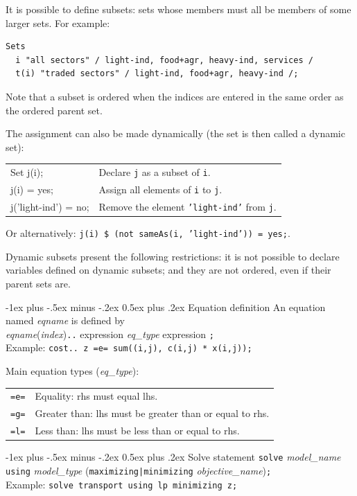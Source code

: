 \documentclass[10pt,landscape,a4paper]{article}
\makeatletter
\renewcommand{\section}{\@startsection{section}{1}{0mm}%
                                {-1ex plus -.5ex minus -.2ex}%
                                {0.5ex plus .2ex}%
                                {\color{blue}\normalfont\large\bfseries}}
\makeatother
\begin{document}
\begin{multicols}{2}
It is possible to define subsets: sets whose members must all be members of some
larger sets. For example:\\
\begin{verbatim}
Sets
  i "all sectors" / light-ind, food+agr, heavy-ind, services /
  t(i) "traded sectors" / light-ind, food+agr, heavy-ind /;
\end{verbatim}
Note that a subset is ordered when the indices are entered in the same order as
the ordered parent set.

The assignment can also be made dynamically (the set is then called a dynamic
set):
\begin{tabularx}{\columnwidth}{@{}>{\ttfamily}l>{\raggedright\arraybackslash}X@{}}
Set j(i);& Declare \texttt{j} as a subset of \texttt{i}. \\
j(i) = yes;& Assign all elements of \texttt{i} to \texttt{j}.\\
j('light-ind') = no;& Remove the element \texttt{'light-ind'} from \texttt{j}.
\end{tabularx}
Or alternatively: \texttt{j(i) \$ (not sameAs(i, 'light-ind')) = yes;}.

Dynamic subsets present the following restrictions: it is not possible to
declare variables defined on dynamic subsets; and they are not ordered, even if
their parent sets are.

\section{Equation definition}
An equation named \emph{eqname} is defined by\\
\emph{eqname}(\emph{index})\verb!..! expression \emph{eq\_type} expression \verb!;!\\
Example: \verb!cost.. z =e= sum((i,j), c(i,j) * x(i,j));!

Main equation types (\emph{eq\_type}):\\
\begin{tabular}{@{}ll@{}}
  \verb!=e=! & Equality: rhs must equal lhs.\\
  \verb!=g=! & Greater than: lhs must be greater than or equal to rhs.\\
  \verb!=l=! & Less than: lhs must be less than or equal to rhs.
\end{tabular}

\columnbreak{}
\section{Solve statement}
\verb!solve! \emph{model\_name} \verb!using! \emph{model\_type} (\verb!maximizing|minimizing! \emph{objective\_name})\verb!;!\\
Example: \verb!solve transport using lp minimizing z;!


\end{multicols}
\end{document}
